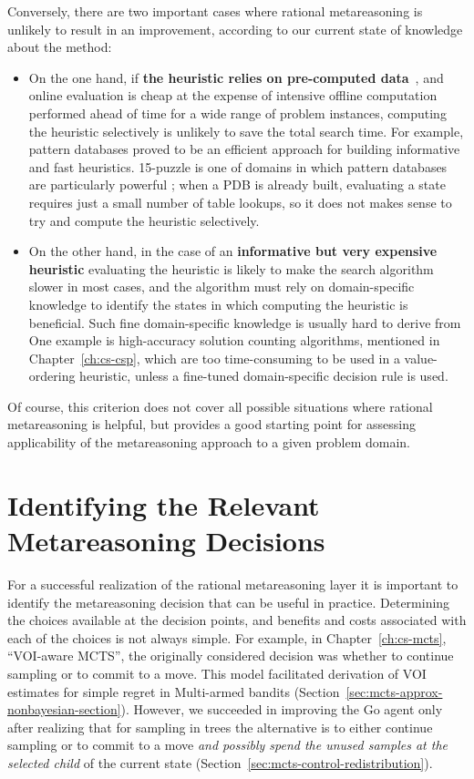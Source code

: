 Conversely, there are two important cases where rational metareasoning
is unlikely to result in an improvement, according to our current state
of knowledge about the method: 
\begin{itemize}
\item On the one hand, if \textbf{the heuristic relies on pre-computed
  data}~\cite{pattern,Felner.apdb}, and online evaluation is cheap at the expense of intensive
  offline computation performed ahead of time for a wide
  range of problem instances, computing the heuristic selectively is
  unlikely to save the total search time. For example, pattern
  databases \cite{pattern} proved to be an efficient approach for
  building informative and fast heuristics. 15-puzzle is one of
  domains in which pattern databases are particularly powerful
  \cite{Felner.apdb}; when a PDB is already built,  evaluating a state
  requires  just a small number of table lookups, so it does not makes sense to try and
  compute the heuristic selectively.
\item On the other hand, in the case of an \textbf{informative but
  very expensive heuristic} evaluating the heuristic is likely to make
  the search algorithm slower in most cases, and the algorithm must
  rely on domain-specific knowledge to identify the states in which
  computing the heuristic is beneficial.  Such fine domain-specific
  knowledge is usually hard to derive from  One
  example is high-accuracy solution counting algorithms, mentioned in
  Chapter~\ref{ch:cs-csp}, which are too time-consuming to be used
  in a value-ordering heuristic, unless a fine-tuned domain-specific
  decision rule is used.
\end{itemize}

Of course, this criterion does not cover all possible situations where
rational metareasoning is helpful, but provides a good starting point
for assessing applicability of the metareasoning approach to a given
problem domain.

\section{Identifying the Relevant Metareasoning Decisions}

For a successful realization of the rational metareasoning layer it is
important to identify the metareasoning decision that can be useful
in practice. Determining the
choices available at the decision points, and benefits and costs
associated with each of the choices is not always simple. For example,
in Chapter~\ref{ch:cs-mcts}, ``VOI-aware MCTS'', the originally
considered decision was whether to continue sampling or to commit to a
move. This model facilitated derivation of VOI estimates for simple
regret in Multi-armed bandits
(Section~\ref{sec:mcts-approx-nonbayesian-section}). However, we
succeeded in improving the Go agent only after realizing that for sampling in trees
the alternative is to either continue sampling or to commit to a move
\emph{and possibly spend the unused samples at the selected child} of
the current state (Section~\ref{sec:mcts-control-redistribution}).

